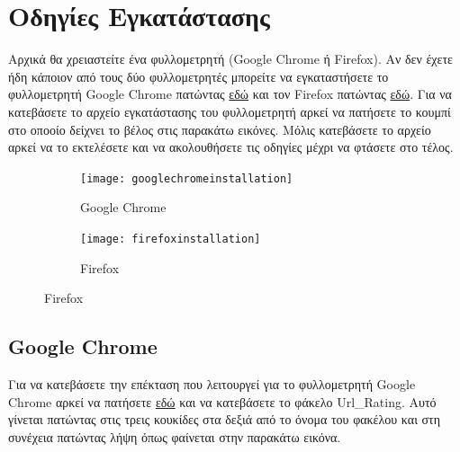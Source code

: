 \documentclass{article}
\begin{document}
\section*{Οδηγίες Εγκατάστασης}

Αρχικά θα χρειαστείτε ένα φυλλομετρητή (Google Chrome ή Firefox). Αν δεν έχετε ήδη κάποιον από τους δύο φυλλομετρητές μπορείτε να εγκαταστήσετε το φυλλομετρητή Google Chrome πατώντας \href{https://www.google.com/chrome/}{εδώ} και τον Firefox πατώντας \href{https://www.mozilla.org/el/firefox/new/}{εδώ}. Για να κατεβάσετε το αρχείο εγκατάστασης του φυλλομετρητή αρκεί να πατήσετε το κουμπί στο οποοίο δείχνει το βέλος στις παρακάτω εικόνες. Μόλις κατεβάσετε το αρχείο αρκεί να το εκτελέσετε και να ακολουθήσετε τις οδηγίες μέχρι να φτάσετε στο τέλος.

\begin{figure}[H]
    \centering
    \begin{subfigure}{.45\textwidth}
        \texttt{[image: googlechromeinstallation]}
        \caption{Google Chrome}
        \label{Fig:sub1}
    \end{subfigure}
    \hfill
    \begin{subfigure}{.45\textwidth}
        \texttt{[image: firefoxinstallation]}
        \caption{Firefox}
        \label{Fig:sub2}
    \end{subfigure}
\end{figure}

\subsection*{Google Chrome}

Για να κατεβάσετε την επέκταση που λειτουργεί για το φυλλομετρητή Google Chrome αρκεί να πατήσετε \href{https://drive.google.com/drive/folders/1JhenJNu0teL6oo55IWzdhamBNJH3g-d_?usp=share_link}{εδώ} και να κατεβάσετε το φάκελο Url\_Rating. Αυτό γίνεται πατώντας στις τρεις κουκίδες στα δεξιά από το όνομα του φακέλου και στη συνέχεια πατώντας λήψη όπως φαίνεται στην παρακάτω εικόνα.
\end{document}
